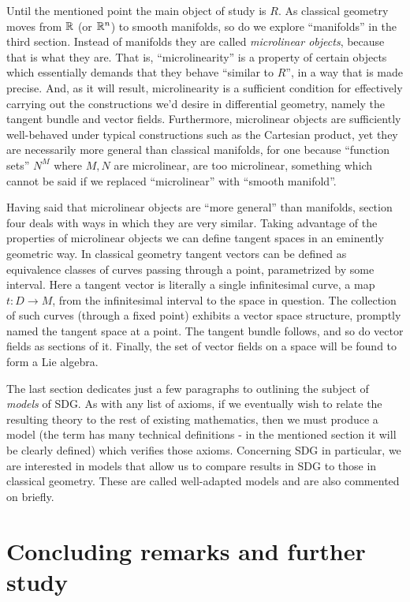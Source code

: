 Until the mentioned point the main object of study is \( R \). As classical geometry moves from \( \mathbb{R} \) (or \( \mathbb{R}^n \)) to smooth manifolds, so do we explore ``manifolds'' in the third section. Instead of manifolds they are called \emph{microlinear objects}, because that is what they are. That is, ``microlinearity'' is a property of certain objects which essentially demands that they behave ``similar to \( R \)'', in a way that is made precise. And, as it will result, microlinearity is a sufficient condition for effectively carrying out the constructions we'd desire in differential geometry, namely the tangent bundle and vector fields. Furthermore, microlinear objects are sufficiently well-behaved under typical constructions such as the Cartesian product, yet they are necessarily more general than classical manifolds, for one because ``function sets'' \( N^M \) where \( M,N \) are microlinear, are too microlinear, something which cannot be said if we replaced ``microlinear'' with ``smooth manifold''.

Having said that microlinear objects are ``more general'' than manifolds, section four deals with ways in which they are very similar. Taking advantage of the properties of microlinear objects we can define tangent spaces in an eminently geometric way. In classical geometry tangent vectors can be defined as equivalence classes of curves passing through a point, parametrized by some interval. Here a tangent vector is literally a single infinitesimal curve, a map \( t:D\to M \), from the infinitesimal interval to the space in question. The collection of such curves (through a fixed point) exhibits a vector space structure, promptly named the tangent space at a point. The tangent bundle follows, and so do vector fields as sections of it. Finally, the set of vector fields on a space will be found to form a Lie algebra.

The last section dedicates just a few paragraphs to outlining the subject of \emph{models} of SDG. As with any list of axioms, if we eventually wish to relate the resulting theory to the rest of existing mathematics, then we must produce a model (the term has many technical definitions - in the mentioned section it will be clearly defined) which verifies those axioms. Concerning SDG in particular, we are interested in models that allow us to compare results in SDG to those in classical geometry. These are called well-adapted models and are also commented on briefly.

\section{Concluding remarks and further study}

